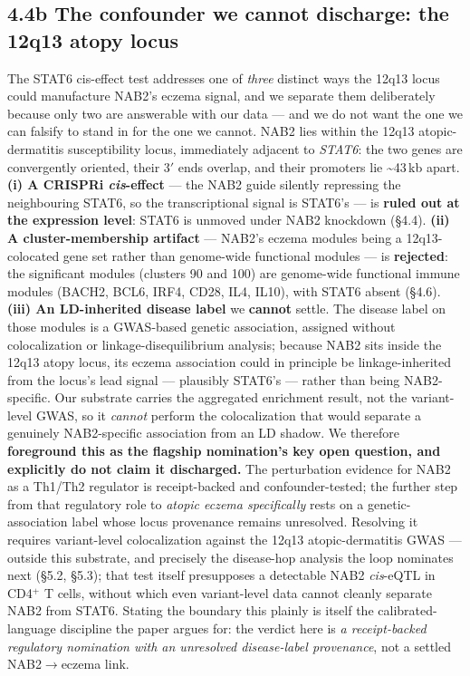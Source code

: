 \subsection*{\texorpdfstring{4.4b The confounder we cannot discharge: the 12q13 atopy locus}{4.4b The confounder we cannot discharge: the 12q13 atopy locus}}\label{the-confounder-we-cannot-discharge-the-12q13-atopy-locus}

The STAT6 cis-effect test addresses one of \emph{three} distinct ways the 12q13 locus could manufacture NAB2's
eczema signal, and we separate them deliberately because only two are answerable with our data --- and we do
not want the one we can falsify to stand in for the one we cannot. NAB2 lies within the 12q13
atopic-dermatitis susceptibility locus, immediately adjacent to \emph{STAT6}: the two genes are convergently
oriented, their 3$'$ ends overlap, and their promoters lie \textasciitilde43\,kb apart. \textbf{(i) A CRISPRi \emph{cis}-effect}
--- the NAB2 guide silently repressing the neighbouring STAT6, so the transcriptional signal is STAT6's --- is
\textbf{ruled out at the expression level}: STAT6 is unmoved under NAB2 knockdown (\S{}4.4). \textbf{(ii) A cluster-membership
artifact} --- NAB2's eczema modules being a 12q13-colocated gene set rather than genome-wide functional
modules --- is \textbf{rejected}: the significant modules (clusters 90 and 100) are genome-wide functional
immune modules (BACH2, BCL6, IRF4, CD28, IL4, IL10), with STAT6 absent (\S{}4.6). \textbf{(iii) An
LD-inherited disease label} we \textbf{cannot} settle. The disease label on those modules is a GWAS-based
genetic association, assigned without colocalization or linkage-disequilibrium analysis; because NAB2 sits
inside the 12q13 atopy locus, its eczema association could in principle be linkage-inherited from the locus's
lead signal --- plausibly STAT6's --- rather than being NAB2-specific. Our substrate carries the aggregated
enrichment result, not the variant-level GWAS, so it \emph{cannot} perform the colocalization that would
separate a genuinely NAB2-specific association from an LD shadow. We therefore \textbf{foreground this as the
flagship nomination's key open question, and explicitly do not claim it discharged.} The perturbation
evidence for NAB2 as a Th1/Th2 regulator is receipt-backed and confounder-tested; the further step from that
regulatory role to \emph{atopic eczema specifically} rests on a genetic-association label whose locus
provenance remains unresolved. Resolving it requires variant-level colocalization against the 12q13
atopic-dermatitis GWAS --- outside this substrate, and precisely the disease-hop analysis the loop nominates
next (\S{}5.2, \S{}5.3); that test itself presupposes a detectable NAB2 \emph{cis}-eQTL in CD4$^+$ T cells,
without which even variant-level data cannot cleanly separate NAB2 from STAT6. Stating the boundary this plainly is itself the calibrated-language discipline the
paper argues for: the verdict here is \emph{a receipt-backed regulatory nomination with an unresolved
disease-label provenance}, not a settled NAB2$\rightarrow$eczema link.

